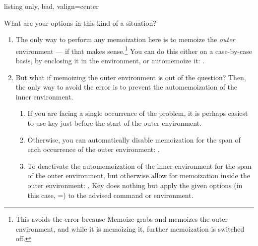 \documentclass[a4paper,11pt]{article}
\begin{document}
\begingroup
{}
\begin{tcbraster}
\begin{tcblisting}{listing only, bad, valign=center}
\newenvironment{foo}%
{%
  \begin{tikzpicture}
}
{%
  \end{tikzpicture}
}  
\end{tcblisting}
\end{tcbraster}
\endgroup

What are your options in this kind of a situation?
\begin{enumerate}
\item The only way to perform any memoization here is to memoize the
  \emph{outer} environment --- if that makes sense.\footnote{This avoids the
    error because Memoize grabs and memoizes the outer environment, and while
    it is memoizing it, further memoization is switched off.}  You can do this
  either on a case-by-case basis, by enclosing it in the 
  environment, or automemoize it: .  
\item But what if memoizing the outer environment is out of the question?
  Then, the only way to avoid the error is to prevent the automemoization of
  the inner environment.
  \begin{enumerate}
  \item If you are facing a single occurrence of the problem, it is perhaps
    easiest to use key  just before the start of the outer
    environment.
  \item Otherwise, you can automatically disable memoization for the span of
    each occurrence of the outer environment: .
  \item To deactivate the automemoization of the inner environment for the span
    of the outer environment, but otherwise allow for memoization inside the
    outer environment: . Key  does nothing but apply the
    given options (in this case, =)
    to the advised command or environment.
  \end{enumerate}
\end{enumerate}
\end{document}
